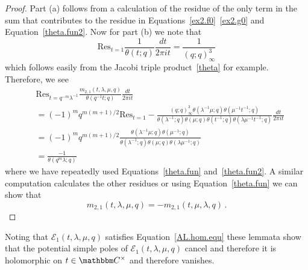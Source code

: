 \documentclass[12pt,reqno]{amsart}
\theoremstyle{definition}
\def\BC{\mathbbm C}
\def\calE{\mathcal E}
\def\Res{\mathrm{Res}}
\def\be{\begin{equation}}
\def\ee{\end{equation}}
\begin{document}
\begin{proof}
  Part (a) follows from a calculation of the residue of the only term in the
  sum that contributes to the residue in Equations~\eqref{ex2.f0}~\eqref{ex2.g0}
  and Equation~\eqref{theta.fun2}. Now for part (b) we note that
\be
\Res_{t=1}\frac{1}{\theta(t;q)}\frac{dt}{2\pi it}=\frac{1}{(q;q)_{\infty}^{3}}
\ee
which follows easily from the Jacobi triple product~\eqref{theta} for example.
Therefore, we see
\be
\begin{aligned}
  &\Res_{t=q^{-m}\lambda^{-1}}
  \frac{m_{2,1}(t,\lambda,\mu,q)}{\theta(q^{-1}t;q)}\frac{dt}{2\pi it}\\
&=
(-1)^{m}q^{m(m+1)/2}\Res_{t=1}
-\frac{(q;q)_{\infty}^{3}\theta(\lambda ^{-1}\mu ;q)
\theta(\mu ^{-1}t^{-1};q)}{\theta(\lambda ^{-1};q)\theta(\mu ;q)
\theta(t^{-1};q)\theta(\lambda\mu ^{-1}t^{-1};q)}\frac{dt}{2\pi it}\\
&=
(-1)^{m}q^{m(m+1)/2}
\frac{\theta(\lambda ^{-1}\mu ;q)
\theta(\mu ^{-1};q)}{\theta(\lambda ^{-1};q)\theta(\mu ;q)
\theta(\lambda\mu ^{-1};q)}\\
&=
\frac{-1}{\theta(q^{m}\lambda;q)}
\end{aligned}
\ee
where we have repeatedly used Equations~\eqref{theta.fun}
and~\eqref{theta.fun2}. A similar computation calculates the other residues
or using Equation~\eqref{theta.fun} we can show that
\be
m_{2,1}(t,\lambda,\mu,q)=-m_{2,1}(t,\mu,\lambda,q) \,.
\ee
\end{proof}

Noting that $\calE_{1}(t,\lambda,\mu,q)$ satisfies Equation~\eqref{AL.hom.equ}
these lemmata show that the potential simple poles of $\calE_{1}(t,\lambda,\mu,q)$
cancel and therefore it is holomorphic on $t\in\BC^{\times}$ and therefore
vanishes.
\end{document}
